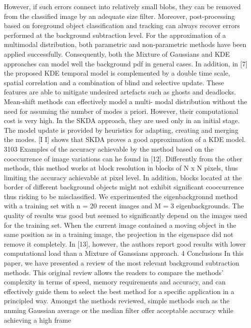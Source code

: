 However,
if
such
errors
connect
into relatively
small blobs, they can
be
removed
from
the
classified
image by an adequate
size
filter.
Moreover, post-processing based on foreground
object
classification
and
tracking can always recover
errors
performed
at
the background subtraction
level.
For the approximation
of
a multimodal
distribution,
both parametric and non-parametric methods have been
applied successfully. Consequently, both the Mixture of
Gaussians and KDE approaches
can model
well
the
background
pdf
in
general
cases.
In
addition,
in
[7]
the
proposed KDE temporal model
is
complemented by a
double
time
scale, spatial
correlation and a combination
of
blind and
selective
update.
These
features are able
to
mitigate
undesired
artefacts
such
as
ghosts
and
deadlocks.
Mean-shift methods can effectively model a multi-
modal
distribution
without the need
for
assuming the
number
of
modes a
priori.
However,
their
computational
cost
is
very high.
In
the
SKDA approach, they
are
used
only
in
an
initial stage.
The
model update
is
provided by
heuristics for
adapting, creating and merging
the
modes.
[I I]
shows
that
SKDA proves a good approximation
of
a
KDE
model.
3103
Examples
of
the accuracy
achievable by
the
method
based
on
the cooccurrence
of
image
variations
can
he
found
in
[12].
Differently
from
the other
methods, this
method works at
block resolution
in
blocks
of
N
x
N
pixels,
thus limiting the accuracy
achievable
at
pixel level.
In
addition, blocks
located
at
the
border
of
different
background
objects
might not exhibit significant
cooccurrence thus
risking
to
be misclassified.
We experimented the eigenbackgronnd
method with
a
training set
with
n
=
20
recent images
and
M
=
3
eigenbackgrounds.
The
quality of
results
was
good
but
seemed
to
significantly
depend on
the images
used
for the
training
set.
When
the current
image
contained a
moving
object
in the
same
position
as
in a
training
image,
the
projection
in
the eigenspace did
not
remove it
completely.
In
[13],
however,
the
authors report
good
results
with
lower
computational load than a Mixture
of
Ganssians
approach.
4
Conclusions
In
this paper, we have presented
a
review
of
the
most
relevant
background
subtraction methods. This
original review allows
the
readers
to
compare
the
methods’ complexity
in
terms
of
speed, memory
requirements
and
accuracy,
and
can
effectively
guide
them
to
select
the best
method
for a
specific
application in
a principled
way.
Amongst
the
methods
reviewed,
simple
methods
such
as
the
nnming
Gaussian average
or
the
median
filter
offer acceptable accuracy
while
achieving
a
high
frame
